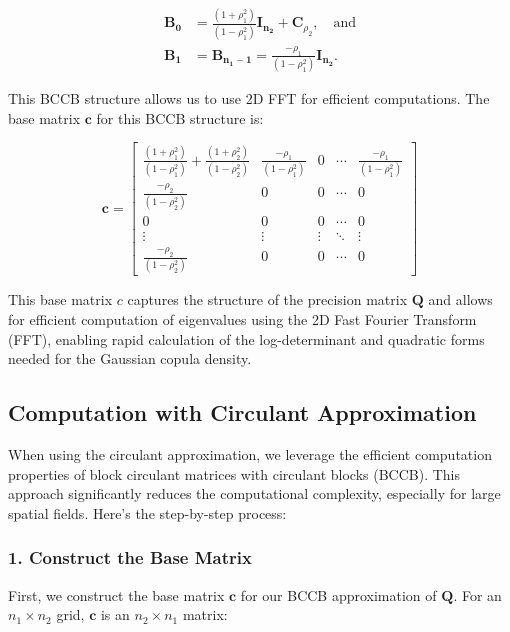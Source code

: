 \documentclass[
  letterpaper,
  DIV=11,
  numbers=noendperiod]{scrartcl}
\begin{document}
\[
\begin{aligned}
\mathbf{B_0} &= \frac{(1+\rho_1^2)}{(1 - \rho_1^2)}\mathbf{I_{n_2}} + \mathbf C_{\rho_2}, \quad \text{and} \\
\mathbf{B_1} &= \mathbf{B_{n_1 - 1}} = \frac{-\rho_1}{(1 - \rho_1^2)}\mathbf{I_{n_2}}.
\end{aligned}
\]

This BCCB structure allows us to use 2D FFT for efficient computations.
The base matrix \(\mathbf c\) for this BCCB structure is:

\[
\mathbf{c} = \begin{bmatrix}
\frac{(1+\rho_1^2)}{(1 - \rho_1^2)} + \frac{(1+\rho_2^2)}{(1 - \rho_2^2)} & \frac{-\rho_1}{(1 - \rho_1^2)} & 0 & \cdots  & \frac{-\rho_1}{(1 - \rho_1^2)} \\
\frac{-\rho_2}{(1 - \rho_2^2)} & 0 & 0 & \cdots  & 0 \\
0 & 0 & 0 & \cdots  & 0 \\
\vdots & \vdots & \vdots & \ddots &  \vdots \\
\frac{-\rho_2}{(1 - \rho_2^2)} & 0 & 0 & \cdots  & 0
\end{bmatrix}
\]

This base matrix \(c\) captures the structure of the precision matrix
\(\mathbf Q\) and allows for efficient computation of eigenvalues using
the 2D Fast Fourier Transform (FFT), enabling rapid calculation of the
log-determinant and quadratic forms needed for the Gaussian copula
density.

\subsection{Computation with Circulant
Approximation}\label{computation-with-circulant-approximation}

When using the circulant approximation, we leverage the efficient
computation properties of block circulant matrices with circulant blocks
(BCCB). This approach significantly reduces the computational
complexity, especially for large spatial fields. Here's the step-by-step
process:

\subsubsection{1. Construct the Base
Matrix}\label{construct-the-base-matrix}

First, we construct the base matrix \(\mathbf c\) for our BCCB
approximation of \(\mathbf Q\). For an \(n_1 \times n_2\) grid,
\(\mathbf c\) is an \(n_2 \times n_1\) matrix:
\end{document}

